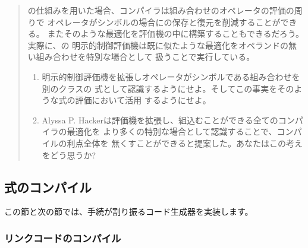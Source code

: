 \begin{quote}
の仕組みを用いた場合、コンパイラは組み合わせのオペレータの評価の周りで
オペレータがシンボルの場合にの保存と復元を削減することができる。
またそのような最適化を評価機の中に構築することもできるだろう。実際に、の
明示的制御評価機は既に似たような最適化をオペランドの無い組み合わせを特別な場合として
扱うことで実行している。

\begin{enumerate}[a]

\item
明示的制御評価機を拡張しオペレータがシンボルである組み合わせを別のクラスの
式として認識するようにせよ。そしてこの事実をそのような式の評価において活用
するようにせよ。

\item
Alyssa P. Hackerは評価機を拡張し、組込むことができる全てのコンパイラの最適化を
より多くの特別な場合として認識することで、コンパイルの利点全体を
無くすことができると提案した。あなたはこの考えをどう思うか?

\end{enumerate}
\end{quote}

\subsection{式のコンパイル}
\label{Section 5.5.2}


この節と次の節では、手続が割り振るコード生成器を実装します。

\subsubsection*{リンクコードのコンパイル}

